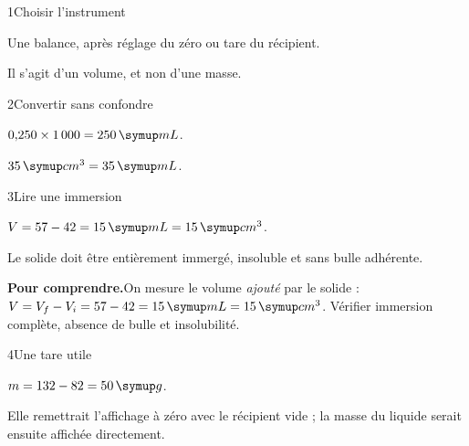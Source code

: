 \par\noindent\begin{minipage}{\linewidth}
\begin{corrige}{1}{Choisir l’instrument}
\begin{questions}
\item Une balance, après réglage du zéro ou tare du récipient.
\item Il s’agit d’un volume, et non d’une masse.
\end{questions}
\end{corrige}
\end{minipage}
\par\noindent\begin{minipage}{\linewidth}
\begin{corrige}{2}{Convertir sans confondre}
\begin{questions}
\item $0{,}250\times1\,000=250\unite{mL}$.
\item $35\unite{cm^3}=35\unite{mL}$.
\end{questions}
\end{corrige}
\end{minipage}
\par\noindent\begin{minipage}{\linewidth}
\begin{corrige}{3}{Lire une immersion}
\begin{questions}
\item $V=57-42=15\unite{mL}=15\unite{cm^3}$.
\item Le solide doit être entièrement immergé, insoluble et sans bulle adhérente.
\end{questions}
\par\smallskip\noindent\textbf{Pour comprendre.}\enspace On mesure le volume \emph{ajouté} par le solide : $V=V_f-V_i=57-42=15\unite{mL}=15\unite{cm^3}$. Vérifier immersion complète, absence de bulle et insolubilité.\par
{}
\end{corrige}
\end{minipage}
\par\noindent\begin{minipage}{\linewidth}
\begin{corrige}{4}{Une tare utile}
\begin{questions}
\item $m=132-82=50\unite g$.
\item Elle remettrait l’affichage à zéro avec le récipient vide ; la masse du liquide serait ensuite affichée directement.
\end{questions}
\end{corrige}
\end{minipage}
